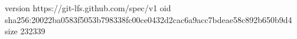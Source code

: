 version https://git-lfs.github.com/spec/v1
oid sha256:20022ba0583f5053b798338fc00ce0432d2cac6a9acc7bdeae58c892b650b9d4
size 232339
